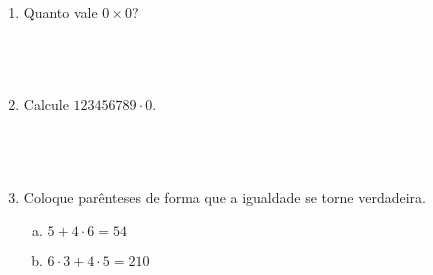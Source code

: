 \documentclass[a4paper,14pt]{article}
\begin{document}
\begin{multicols}{2}
\begin{enumerate}
\begin{enumerate}[a)]
    		\end{enumerate}
    		\item Quanto vale $0 \times 0$? \\\\\\\\
    		\item Calcule $123 456 789 \cdot 0$. \\\\\\\\
    		\item Coloque parênteses de forma que a igualdade se torne verdadeira. 
    		\begin{enumerate}[a)]
    			\item $5 + 4 \cdot 6 = 54$ 
    			\item $6 \cdot 3 + 4 \cdot 5 = 210$
    		\end{enumerate}
    	\end{enumerate}
    	$~$ \\ $~$ \\ $~$ \\ $~$ \\ $~$ \\ $~$ \\ $~$ \\ $~$ \\ $~$ \\ $~$ \\ $~$ \\ $~$ \\ $~$ \\ $~$ \\ $~$ \\ $~$ \\ $~$ \\ $~$ \\ $~$ \\ $~$ \\ $~$ \\ $~$ \\ $~$ \\ $~$ \\ $~$ \\ $~$ \\ $~$ \\ $~$ \\ $~$ \\ $~$ \\ $~$ \\ $~$ \\ $~$ \\ $~$ \\ $~$ \\ $~$ \\ $~$ \\ $~$ \\ $~$ \\ $~$ \\ $~$ \\ $~$ \\ $~$ \\ $~$ \\
	\end{multicols}
\end{document}
